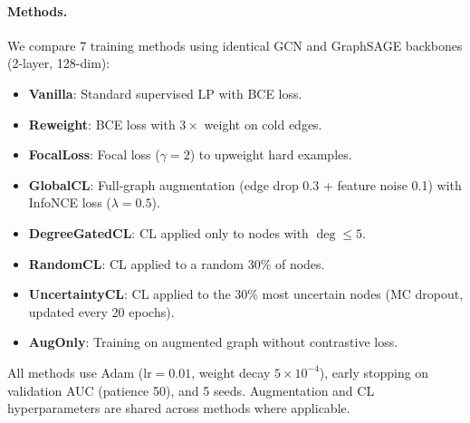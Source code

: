 \paragraph{Methods.}
We compare 7 training methods using identical GCN and GraphSAGE backbones (2-layer, 128-dim):
\begin{itemize}[leftmargin=*, itemsep=1pt]
    \item \textbf{Vanilla}: Standard supervised LP with BCE loss.
    \item \textbf{Reweight}: BCE loss with $3\times$ weight on cold edges.
    \item \textbf{FocalLoss}: Focal loss ($\gamma=2$) to upweight hard examples.
    \item \textbf{GlobalCL}: Full-graph augmentation (edge drop 0.3 + feature noise 0.1) with InfoNCE loss ($\lambda=0.5$).
    \item \textbf{DegreeGatedCL}: CL applied only to nodes with $\deg \leq 5$.
    \item \textbf{RandomCL}: CL applied to a random 30\% of nodes.
    \item \textbf{UncertaintyCL}: CL applied to the 30\% most uncertain nodes (MC dropout, updated every 20 epochs).
    \item \textbf{AugOnly}: Training on augmented graph without contrastive loss.
\end{itemize}

All methods use Adam ($\text{lr}=0.01$, weight decay $5 \times 10^{-4}$), early stopping on validation AUC (patience 50), and 5 seeds. Augmentation and CL hyperparameters are shared across methods where applicable.
